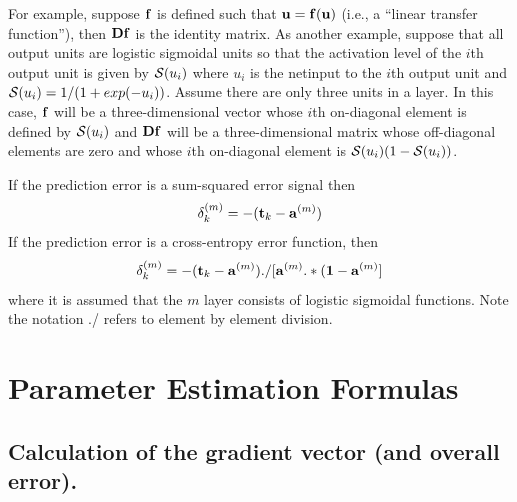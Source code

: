 \documentclass{report}
\begin{document}
For example, suppose ${\bf f}$ is defined such that ${\bf u} = {\bf
f}({\bf u})$ (i.e., a ``linear transfer function''), then ${\bf Df}$
is the identity matrix.  As another example, suppose that all output
units are logistic sigmoidal units
so that the activation level of the $i$th output unit is given by
${\cal S}(u_i)$ where $u_i$ is the netinput to the $i$th output unit
and ${\cal S}(u_i) = 1/(1 + exp(-u_i))$.  Assume there are only three
units in a layer.  In this case, ${\bf f}$ will be a three-dimensional
vector whose $i$th on-diagonal element is defined by ${\cal S}(u_i)$
and ${\bf Df}$ will be a three-dimensional matrix whose off-diagonal
elements are zero and whose $i$th on-diagonal element is
${\cal S}(u_i) (1 - {\cal S}(u_i))$.

If the prediction error is a sum-squared error signal then
\begin{equation}
\delta^{(m)}_k = -({\bf t}_k - {\bf a}^{(m)})
\end{equation}
If the prediction error is a cross-entropy error function, then
\begin{equation}
\delta^{(m)}_k = -({\bf t}_k - {\bf a}^{(m)}) ./
[{\bf a}^{(m)} .* ({\bf 1} - {\bf a}^{(m)}]
\end{equation}
where it is assumed that the $m$ layer consists of logistic sigmoidal
functions. Note the notation ./ refers to element by element division.

\section{Parameter Estimation Formulas}

\subsection{Calculation of the gradient vector (and overall error).}
\end{document}
